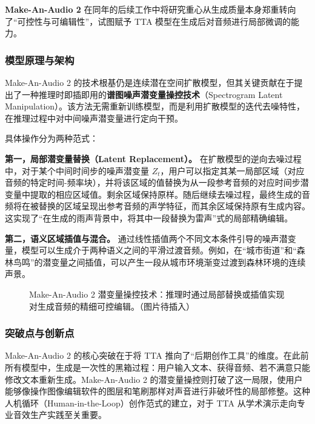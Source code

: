 \documentclass[12pt,a4paper]{article}
\begin{document}
\textbf{Make-An-Audio 2} 在同年的后续工作中将研究重心从生成质量本身郑重转向了“可控性与可编辑性”，试图赋予 TTA 模型在生成后对音频进行局部微调的能力。

\subsubsection{模型原理与架构}
Make-An-Audio 2 的技术根基仍是连续潜在空间扩散模型，但其关键贡献在于提出了一种推理时即插即用的\textbf{谱图噪声潜变量操控技术}（Spectrogram Latent Manipulation）。该方法无需重新训练模型，而是利用扩散模型的迭代去噪特性，在推理过程中对中间噪声潜变量进行定向干预。

具体操作分为两种范式：

\textbf{第一，局部潜变量替换（Latent Replacement）。} 在扩散模型的逆向去噪过程中，对于某个中间时间步的噪声潜变量 \(Z_t\)，用户可以指定其某一局部区域（对应音频的特定时间-频率块），并将该区域的值替换为从一段参考音频的对应时间步潜变量中提取的相应区域值。剩余区域保持原样。随后继续去噪过程，最终生成的音频将在被替换的区域呈现出参考音频的声学特征，而其余区域保持原有生成内容。这实现了“在生成的雨声背景中，将其中一段替换为雷声”式的局部精确编辑。

\textbf{第二，语义区域插值与混合。} 通过线性插值两个不同文本条件引导的噪声潜变量，模型可以生成介于两种语义之间的平滑过渡音频。例如，在“城市街道”和“森林鸟鸣”的潜变量之间插值，可以产生一段从城市环境渐变过渡到森林环境的连续声景。

\begin{figure}[htbp]
\centering
{}
\caption{Make-An-Audio 2 潜变量操控技术：推理时通过局部替换或插值实现对生成音频的精细可控编辑。（图片待插入）}
\label{fig:makeanaudio2}
\end{figure}

\subsubsection{突破点与创新点}
Make-An-Audio 2 的核心突破在于将 TTA 推向了“后期创作工具”的维度。在此前所有模型中，生成是一次性的黑箱过程：用户输入文本、获得音频、若不满意只能修改文本重新生成。Make-An-Audio 2 的潜变量操控则打破了这一局限，使用户能够像操作图像编辑软件的图层和笔刷那样对声音进行非破坏性的局部修整。这种人机循环（Human-in-the-Loop）创作范式的建立，对于 TTA 从学术演示走向专业音效生产实践至关重要。
\end{document}
